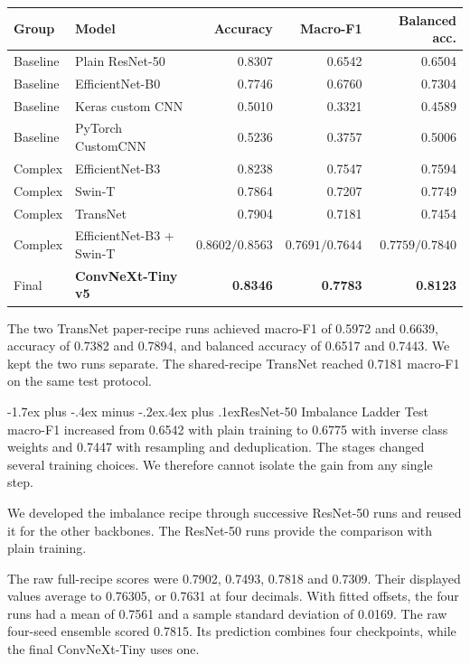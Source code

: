 \documentclass[11pt,a4paper]{article}
\makeatletter
\renewcommand\subsection{\@startsection{subsection}{2}{\z@}%
  {-1.7ex plus -.4ex minus -.2ex}{.4ex plus .1ex}{\sffamily\normalsize\bfseries}}
\makeatother
\begin{document}
\begin{minipage}{\linewidth}
\label{tab:models}
\small
\begin{tabularx}{\linewidth}{@{}lYrrr@{}}
\toprule
Group & Model & Accuracy & Macro-F1 & Balanced acc.\\
\midrule
Baseline & Plain ResNet-50 & 0.8307 & 0.6542 & 0.6504\\
Baseline & EfficientNet-B0 & 0.7746 & 0.6760 & 0.7304\\
Baseline & Keras custom CNN & 0.5010 & 0.3321 & 0.4589\\
Baseline & PyTorch CustomCNN & 0.5236 & 0.3757 & 0.5006\\
\addlinespace[2pt]
Complex & EfficientNet-B3 & 0.8238 & 0.7547 & 0.7594\\
Complex & Swin-T & 0.7864 & 0.7207 & 0.7749\\
Complex & TransNet & 0.7904 & 0.7181 & 0.7454\\
Complex & EfficientNet-B3 + Swin-T & \(0.8602/0.8563\) & \(0.7691/0.7644\) & \(0.7759/0.7840\)\\
\addlinespace[2pt]
Final & \textbf{ConvNeXt-Tiny v5} & \textbf{0.8346} & \textbf{0.7783} & \textbf{0.8123}\\
\bottomrule
\end{tabularx}
\end{minipage}

The two TransNet paper-recipe runs achieved macro-F1 of 0.5972 and 0.6639, accuracy of 0.7382 and 0.7894, and balanced accuracy of 0.6517 and 0.7443. We kept the two runs separate. The shared-recipe TransNet reached 0.7181 macro-F1 on the same test protocol.

\subsection{ResNet-50 Imbalance Ladder}
Test macro-F1 increased from 0.6542 with plain training to 0.6775 with inverse class weights and 0.7447 with resampling and deduplication. The stages changed several training choices. We therefore cannot isolate the gain from any single step.

We developed the imbalance recipe through successive ResNet-50 runs and reused it for the other backbones. The ResNet-50 runs provide the comparison with plain training.

The raw full-recipe scores were 0.7902, 0.7493, 0.7818 and 0.7309. Their displayed values average to 0.76305, or 0.7631 at four decimals. With fitted offsets, the four runs had a mean of 0.7561 and a sample standard deviation of 0.0169. The raw four-seed ensemble scored 0.7815. Its prediction combines four checkpoints, while the final ConvNeXt-Tiny uses one.
\end{document}
